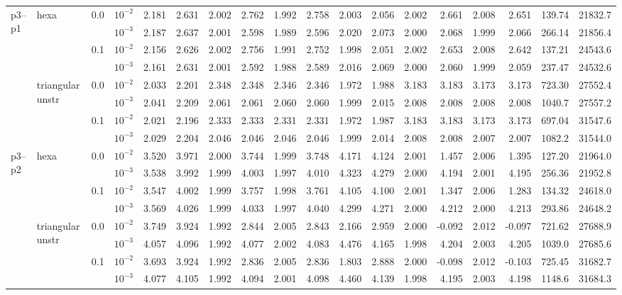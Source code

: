\begin{longtable}{llclrrrrrrrrrrrrrr}
\multirow{8}{*}{p3--p1} & \multirow{4}{*}{hexa} & \multirow{2}{*}{0.0} & $10^{-2}$ & 2.181 & 2.631 & 2.002 & 2.762 & 1.992 & 2.758 & 2.003 & 2.056 & 2.002 & 2.661 & 2.008 & 2.651 & 139.74 & 21832.7 \\
& & & $10^{-3}$ & 2.187 & 2.637 & 2.001 & 2.598 & 1.989 & 2.596 & 2.020 & 2.073 & 2.000 & 2.068 & 1.999 & 2.066 & 266.14 & 21856.4 \\\cline{3-18}
& & \multirow{2}{*}{0.1} & $10^{-2}$ & 2.156 & 2.626 & 2.002 & 2.756 & 1.991 & 2.752 & 1.998 & 2.051 & 2.002 & 2.653 & 2.008 & 2.642 & 137.21 & 24543.6 \\
& & & $10^{-3}$ & 2.161 & 2.631 & 2.001 & 2.592 & 1.988 & 2.589 & 2.016 & 2.069 & 2.000 & 2.060 & 1.999 & 2.059 & 237.47 & 24532.6 \\\cline{2-18}
& \multirow{4}{*}{triangular unstr} & \multirow{2}{*}{0.0} & $10^{-2}$ & 2.033 & 2.201 & 2.348 & 2.348 & 2.346 & 2.346 & 1.972 & 1.988 & 3.183 & 3.183 & 3.173 & 3.173 & 723.30 & 27552.4 \\
& & & $10^{-3}$ & 2.041 & 2.209 & 2.061 & 2.061 & 2.060 & 2.060 & 1.999 & 2.015 & 2.008 & 2.008 & 2.008 & 2.008 & 1040.7 & 27557.2 \\\cline{3-18}
& & \multirow{2}{*}{0.1} & $10^{-2}$ & 2.021 & 2.196 & 2.333 & 2.333 & 2.331 & 2.331 & 1.972 & 1.987 & 3.183 & 3.183 & 3.173 & 3.173 & 697.04 & 31547.6 \\
& & & $10^{-3}$ & 2.029 & 2.204 & 2.046 & 2.046 & 2.046 & 2.046 & 1.999 & 2.014 & 2.008 & 2.008 & 2.007 & 2.007 & 1082.2 & 31544.0 \\\hline

\multirow{8}{*}{p3--p2} & \multirow{4}{*}{hexa} & \multirow{2}{*}{0.0} & $10^{-2}$ & 3.520 & 3.971 & 2.000 & 3.744 & 1.999 & 3.748 & 4.171 & 4.124 & 2.001 & 1.457 & 2.006 & 1.395 & 127.20 & 21964.0 \\
& & & $10^{-3}$ & 3.538 & 3.992 & 1.999 & 4.003 & 1.997 & 4.010 & 4.323 & 4.279 & 2.000 & 4.194 & 2.001 & 4.195 & 256.36 & 21952.8 \\\cline{3-18}
& & \multirow{2}{*}{0.1} & $10^{-2}$ & 3.547 & 4.002 & 1.999 & 3.757 & 1.998 & 3.761 & 4.105 & 4.100 & 2.001 & 1.347 & 2.006 & 1.283 & 134.32 & 24618.0 \\
& & & $10^{-3}$ & 3.569 & 4.026 & 1.999 & 4.033 & 1.997 & 4.040 & 4.299 & 4.271 & 2.000 & 4.212 & 2.000 & 4.213 & 293.86 & 24648.2 \\\cline{2-18}
& \multirow{4}{*}{triangular unstr} & \multirow{2}{*}{0.0} & $10^{-2}$ & 3.749 & 3.924 & 1.992 & 2.844 & 2.005 & 2.843 & 2.166 & 2.959 & 2.000 & -0.092 & 2.012 & -0.097 & 721.62 & 27688.9 \\
& & & $10^{-3}$ & 4.057 & 4.096 & 1.992 & 4.077 & 2.002 & 4.083 & 4.476 & 4.165 & 1.998 & 4.204 & 2.003 & 4.205 & 1039.0 & 27685.6 \\\cline{3-18}
& & \multirow{2}{*}{0.1} & $10^{-2}$ & 3.693 & 3.924 & 1.992 & 2.836 & 2.005 & 2.836 & 1.803 & 2.888 & 2.000 & -0.098 & 2.012 & -0.103 & 725.45 & 31682.7 \\
& & & $10^{-3}$ & 4.077 & 4.105 & 1.992 & 4.094 & 2.001 & 4.098 & 4.460 & 4.139 & 1.998 & 4.195 & 2.003 & 4.198 & 1148.6 & 31684.3 \\\hline


\end{longtable}
